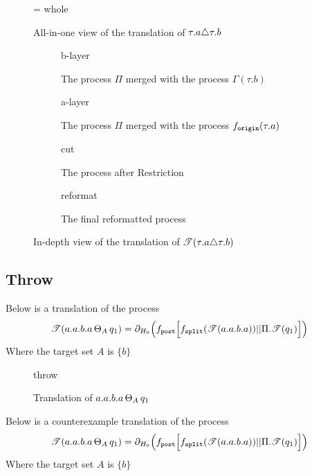 \documentclass[../hons_project.tex]{subfiles}
\begin{document}
\begin{figure}[H]
	\hfuzz=\maxdimen
	\centering
	{whole}
	\caption{All-in-one view of the translation of $\tau.a \triangle \tau.b$}
\end{figure}


\begin{figure}[!ht]
	\centering
	\begin{subfigure}[b]{0.55\textwidth}
		{b-layer}
		\caption{The process $\Pi$ merged with the process $\Gamma(\tau.b)$}
	\end{subfigure}
	\hfill
	\begin{subfigure}[b]{0.43\textwidth}
		{a-layer}
		\caption{The process $\Pi$ merged with the process $f_{\mathtt{origin}}(\tau.a)$}
	\end{subfigure}\hfill

	\begin{subfigure}[b]{0.65\textwidth}
		{cut}
		\caption{The process after Restriction}
	\end{subfigure}\hfill
	\begin{subfigure}[b]{0.3\textwidth}
		{reformat}
		\caption{The final reformatted process}
	\end{subfigure}
	\caption{In-depth view of the translation of $\mathscr{T}(\tau.a \triangle \tau.b)$}
\end{figure}





\newpage
\subsection{Throw}

Below is a translation of the process
		\[\mathscr{T}(a.a.b.a \,\Theta_{A}\, q_{1})     = \partial_{H_{0}}\Bigl(f_{\mathtt{post}} \Bigl[ f_{\mathtt{split}}(\mathscr{T}(a.a.b.a)) | | \Pi.\mathscr{T}(q_{1}) \Bigr]\Bigr)\]
Where the target set $A$ is $\{b\}$
\begin{figure}[H]
	\centering
	{throw}
	\caption{Translation of $a.a.b.a \,\Theta_{A}\, q_{1}$}
\end{figure}

Below is a counterexample translation of the process
		\[\mathscr{T}(a.a.b.a \,\Theta_{A}\, q_{1})     = \partial_{H_{0}}\Bigl(f_{\mathtt{post}} \Bigl[ f_{\mathtt{split}}(\mathscr{T}(a.a.b.a)) | | \Pi.\mathscr{T}(q_{1}) \Bigr]\Bigr)\]
Where the target set $A$ is $\{b\}$
\end{document}
